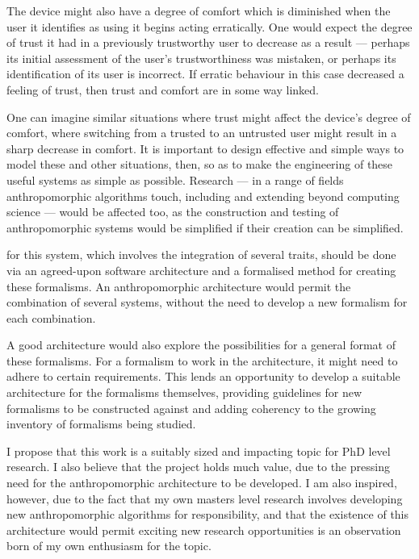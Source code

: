 The device might also have a degree of comfort which is diminished when the user it identifies as using it begins acting erratically. One would expect the degree of trust it had in a previously trustworthy user to decrease as a result --- perhaps its initial assessment of the user's trustworthiness was mistaken, or perhaps its identification of its user is incorrect. If erratic behaviour in this case decreased a feeling of trust, then trust and comfort are in some way linked. \par

One can imagine similar situations where trust might affect the device's degree of comfort, where switching from a trusted to an untrusted user might result in a sharp decrease in comfort. It is important to design effective and simple ways to model these and other situations, then, so as to make the engineering of these useful systems as simple as possible. Research --- in a range of fields anthropomorphic algorithms touch, including and extending beyond computing science --- would be affected too, as the construction and testing of anthropomorphic systems would be simplified if their creation can be simplified.\par

 for this system, which involves the integration of several traits, should be done via an agreed-upon software architecture and a formalised method for creating these formalisms. An anthropomorphic architecture would permit the combination of several systems, without the need to develop a new formalism for each combination.\par

A good architecture would also explore the possibilities for a general format of these formalisms. For a formalism to work in the architecture, it might need to adhere to certain requirements. This lends an opportunity to develop a suitable architecture for the formalisms themselves, providing guidelines for new formalisms to be constructed against and adding coherency to the growing inventory of formalisms being studied.\par

\bigskip %

I propose that this work is a suitably sized and impacting topic for PhD level research. I also believe that the project holds much value, due to the pressing need for the anthropomorphic architecture to be developed. I am also inspired, however, due to the fact that my own masters level research involves developing new anthropomorphic algorithms for responsibility, and that the existence of this architecture would permit exciting new research opportunities is an observation born of my own enthusiasm for the topic. \par

